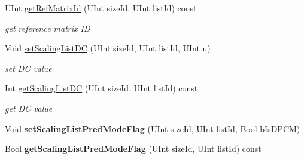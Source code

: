 \begin{DoxyCompactItemize}
U\+Int \hyperlink{class_t_com_scaling_list_a6f180c44df5ad18677c56146523f17d3}{get\+Ref\+Matrix\+Id} (U\+Int size\+Id, U\+Int list\+Id) const
\begin{DoxyCompactList}\small\item\em get reference matrix ID \end{DoxyCompactList}\item 
\mbox{\label{class_t_com_scaling_list_a45adf1f6d369d5251b72fc8b7a9d6515}} 
Void \hyperlink{class_t_com_scaling_list_a45adf1f6d369d5251b72fc8b7a9d6515}{set\+Scaling\+List\+DC} (U\+Int size\+Id, U\+Int list\+Id, U\+Int u)
\begin{DoxyCompactList}\small\item\em set DC value \end{DoxyCompactList}\item 
\mbox{\label{class_t_com_scaling_list_a3ddc78d7c2284e74cdff255d2b0377b6}} 
Int \hyperlink{class_t_com_scaling_list_a3ddc78d7c2284e74cdff255d2b0377b6}{get\+Scaling\+List\+DC} (U\+Int size\+Id, U\+Int list\+Id) const
\begin{DoxyCompactList}\small\item\em get DC value \end{DoxyCompactList}\item 
\mbox{\label{class_t_com_scaling_list_a5b4e83675e40b260a9269eaa4799415e}} 
Void {\bfseries set\+Scaling\+List\+Pred\+Mode\+Flag} (U\+Int size\+Id, U\+Int list\+Id, Bool b\+Is\+D\+P\+CM)
\item 
\mbox{\label{class_t_com_scaling_list_a5e717fb97d8ca43741ae6fac91adcb97}} 
Bool {\bfseries get\+Scaling\+List\+Pred\+Mode\+Flag} (U\+Int size\+Id, U\+Int list\+Id) const
\end{DoxyCompactItemize}
